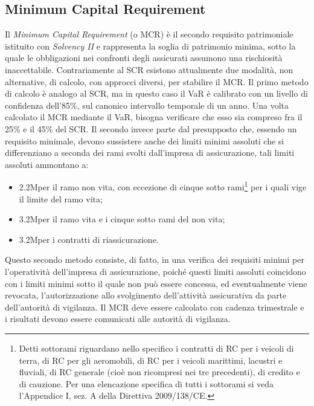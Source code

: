 \subsection{Minimum Capital Requirement}
Il {\itshape Minimum Capital Requirement} (o MCR) è il secondo requisito patrimoniale istituito con \textit{\textit{Solvency I}I} e rappresenta la soglia di patrimonio minima, sotto la quale le obbligazioni nei confronti degli assicurati assumono una rischiosità inaccettabile.
Contrariamente al SCR esistono attualmente due modalità, non alternative, di calcolo, con approcci diversi, per stabilire il MCR.
Il primo metodo di calcolo è analogo al SCR, ma in questo caso il VaR è calibrato con un livello di confidenza dell’85\%, sul canonico intervallo temporale di un anno. Una volta calcolato il MCR mediante il VaR, bisogna verificare che esso sia compreso fra il 25\% e il 45\% del SCR.
Il secondo invece parte dal presupposto che, essendo un requisito minimale, devono sussistere anche dei limiti minimi assoluti che si differenziano a seconda dei rami svolti dall’impresa di assicurazione, tali limiti assoluti ammontano a:
\begin{itemize}
\item	 2.2M\EURtm per il ramo non vita, con eccezione di cinque sotto rami\footnote{Detti sottorami riguardano nello specifico i contratti di RC per i veicoli di terra, di RC per gli aeromobili, di RC per i veicoli marittimi, lacustri e fluviali, di RC generale (cioè non ricompresi nei tre precedenti), di credito e di cauzione. Per una elencazione specifica di tutti i sottorami si veda l’Appendice I, sez. A della Direttiva 2009/138/CE.} per i quali vige il limite del ramo vita;
\item	 3.2M\EURtm per il ramo vita e i cinque sotto rami del non vita;
\item	 3.2M\EURtm per i contratti di riassicurazione.
\end{itemize}
Questo secondo metodo consiste, di fatto, in una verifica dei requisiti minimi per l’operatività dell’impresa di assicurazione, poiché questi limiti assoluti coincidono con i limiti minimi sotto il quale non può essere concessa, ed eventualmente viene revocata, l’autorizzazione allo svolgimento dell’attività assicurativa da parte dell’autorità di vigilanza.
Il MCR deve essere calcolato con cadenza trimestrale e i risultati devono essere comunicati alle autorità di vigilanza.

